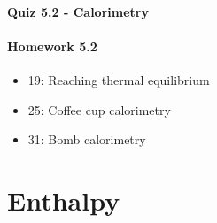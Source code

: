 \documentclass[12pt, openany, letterpaper]{memoir}
\begin{document}
\paragraph*{Quiz 5.2 - Calorimetry}
\paragraph*{Homework 5.2}
\begin{itemize}
  \item 19: Reaching thermal equilibrium 
  \item 25: Coffee cup calorimetry
  \item 31: Bomb calorimetry
\end{itemize}

\section{Enthalpy}
\end{document}
